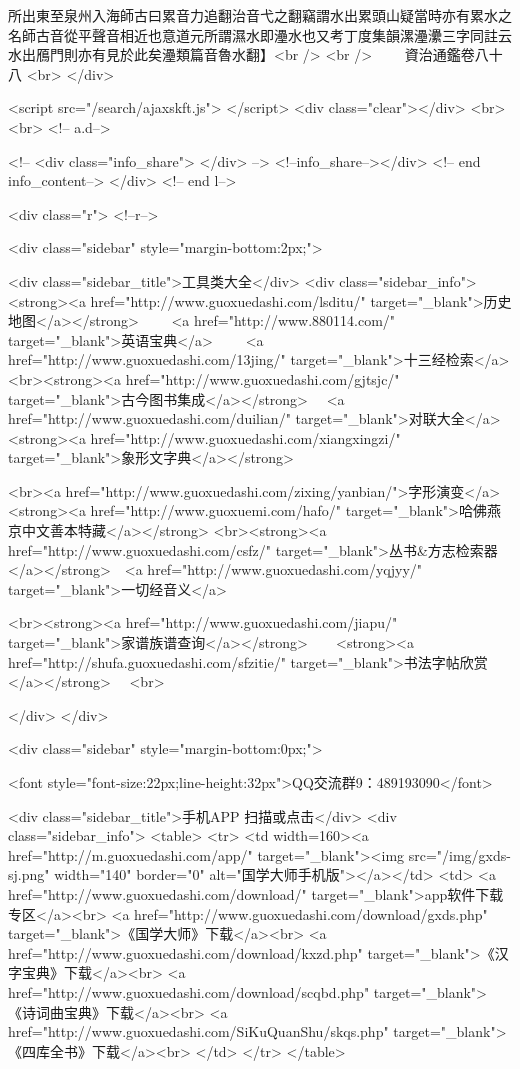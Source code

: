 所出東至泉州入海師古曰累音力追翻治音弋之翻竊謂水出累頭山疑當時亦有累水之名師古音從平聲音相近也意道元所謂濕水即灅水也又考丁度集韻漯灅㶟三字同註云水出鴈門則亦有見於此矣灅類篇音魯水翻】<br />
<br />
　　資治通鑑卷八十八  <br>
   </div> 

<script src="/search/ajaxskft.js"> </script>
 <div class="clear"></div>
<br>
<br>
 <!-- a.d-->

 <!--
<div class="info_share">
</div> 
-->
 <!--info_share--></div>   <!-- end info_content-->
  </div> <!-- end l-->

<div class="r">   <!--r-->



<div class="sidebar"  style="margin-bottom:2px;">

 
<div class="sidebar_title">工具类大全</div>
<div class="sidebar_info">
<strong><a href="http://www.guoxuedashi.com/lsditu/" target="_blank">历史地图</a></strong>　　
<a href="http://www.880114.com/" target="_blank">英语宝典</a>　　
<a href="http://www.guoxuedashi.com/13jing/" target="_blank">十三经检索</a>　
<br><strong><a href="http://www.guoxuedashi.com/gjtsjc/" target="_blank">古今图书集成</a></strong>　
<a href="http://www.guoxuedashi.com/duilian/" target="_blank">对联大全</a>　<strong><a href="http://www.guoxuedashi.com/xiangxingzi/" target="_blank">象形文字典</a></strong>　

<br><a href="http://www.guoxuedashi.com/zixing/yanbian/">字形演变</a>　　<strong><a href="http://www.guoxuemi.com/hafo/" target="_blank">哈佛燕京中文善本特藏</a></strong>
<br><strong><a href="http://www.guoxuedashi.com/csfz/" target="_blank">丛书&方志检索器</a></strong>　<a href="http://www.guoxuedashi.com/yqjyy/" target="_blank">一切经音义</a>　　

<br><strong><a href="http://www.guoxuedashi.com/jiapu/" target="_blank">家谱族谱查询</a></strong>　　<strong><a href="http://shufa.guoxuedashi.com/sfzitie/" target="_blank">书法字帖欣赏</a></strong>　
<br>

</div>
</div>


<div class="sidebar" style="margin-bottom:0px;">

<font style="font-size:22px;line-height:32px">QQ交流群9：489193090</font>


<div class="sidebar_title">手机APP 扫描或点击</div>
<div class="sidebar_info">
<table>
<tr>
	<td width=160><a href="http://m.guoxuedashi.com/app/" target="_blank"><img src="/img/gxds-sj.png" width="140"  border="0" alt="国学大师手机版"></a></td>
	<td>
<a href="http://www.guoxuedashi.com/download/" target="_blank">app软件下载专区</a><br>
<a href="http://www.guoxuedashi.com/download/gxds.php" target="_blank">《国学大师》下载</a><br>
<a href="http://www.guoxuedashi.com/download/kxzd.php" target="_blank">《汉字宝典》下载</a><br>
<a href="http://www.guoxuedashi.com/download/scqbd.php" target="_blank">《诗词曲宝典》下载</a><br>
<a href="http://www.guoxuedashi.com/SiKuQuanShu/skqs.php" target="_blank">《四库全书》下载</a><br>
</td>
</tr>
</table>

